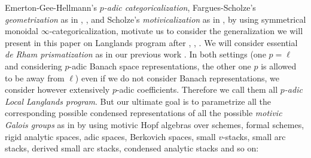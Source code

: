 \documentclass[12pt]{article}
\theoremstyle{definition}
\begin{document}
\indent Emerton-Gee-Hellmann's \textit{$p$-adic categoricalization}, Fargues-Scholze's \textit{geometrization} as in \cite{1FS}, \cite{EGH1}, and Scholze's \textit{motivicalization} as in \cite{1S5}, \cite{1S6} by using symmetrical monoidal $\infty$-categoricalization, motivate us to consider the generalization we will present in this paper on Langlands program after \cite{L1}, \cite{D}, \cite{C}. We will consider essential \textit{de Rham prismatization} as in our previous work \cite{1T}. In both settings (one $p=\ell$ and considering $p$-adic Banach space representations, the other one $p$ is allowed to be away from $\ell$) even if we do not consider Banach representations, we consider however extensively $p$-adic coefficients. Therefore we call them all \textit{$p$-adic Local Langlands program}. But our ultimate goal is to parametrize all the corresponding possible condensed representations of all the possible \textit{motivic Galois groups} as in \cite{2A} by using motivic Hopf algebras over schemes, formal schemes, rigid analytic spaces, adic spaces, Berkovich spaces, small $v$-stacks, small arc stacks, derived small arc stacks, condensed analytic stacks and so on: 
\end{document}
